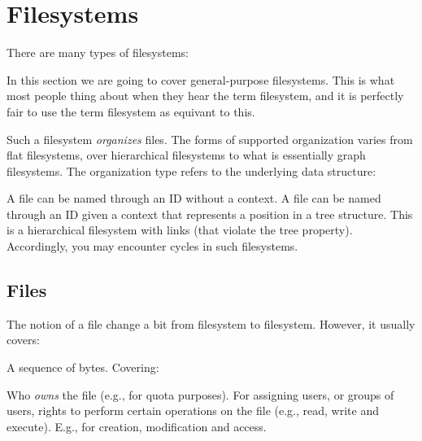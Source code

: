 

\section{Filesystems}

There are many types of filesystems:
\begin{itemize}
\end{itemize}

In this section we are going to cover general-purpose filesystems. This is what most people thing about when they hear the term filesystem, and it is perfectly fair to use the term filesystem as equivant to this.

Such a filesystem \textsl{organizes} files. The forms of supported organization varies from flat filesystems, over hierarchical filesystems to what is essentially graph filesystems. The organization type refers to the underlying data structure:
\begin{itemize}
   A file can be named through an ID without a context.
   A file can be named through an ID given a context that represents a position in a tree structure.
   This is a hierarchical filesystem with links (that violate the tree property). Accordingly, you may encounter cycles in such filesystems.
\end{itemize}

\subsection{Files}

The notion of a file change a bit from filesystem to filesystem. However, it usually covers:
\begin{itemize}
   A sequence of bytes.
   Covering:
    \begin{itemize}
       Who \textsl{owns} the file (e.g., for quota purposes).
       For assigning users, or groups of users, rights to perform certain operations on the file (e.g., read, write and execute).
       E.g., for creation, modification and access.
    \end{itemize}
\end{itemize}

